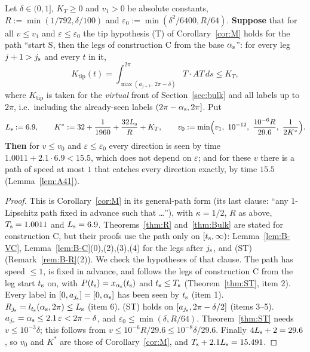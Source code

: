 \begin{corollary}\label{cor:ST}
Let $\delta\in(0,1]$, $K_T\ge0$ and $v_1>0$ be absolute constants, $R:=\min(1/792,\delta/100)$ and
$\varepsilon_0:=\min(\delta^2/6400,R/64)$. \textbf{Suppose} that for all $v\le v_1$ and $\varepsilon\le\varepsilon_0$ the tip
hypothesis \textup{(T)} of Corollary~\ref{cor:M} holds for the path ``start S, then the legs of construction C from the base
$\alpha_{\mathrm s}$'': for every leg $j+1>j_{\mathrm s}$ and every $t$ in it,
\[
K_{\mathrm{tip}}(t)=\int_{\max(a_{j+1},\,2\pi-\delta)}^{2\pi}T\cdot AT\,ds\le K_T ,
\]
where $K_{\mathrm{tip}}$ is taken for the \emph{virtual} front of Section~\ref{sec:bulk} and all labels up to $2\pi$, i.e.\ including the
already-seen labels $(2\pi-\alpha_{\mathrm s},2\pi]$. Put
\[
\BLs:=6.9,\qquad K^*:=32+\frac1{1960}+\frac{32\BLs}R+K_T,\qquad
v_0:=\min\Bigl(v_1,\ 10^{-12},\ \frac{10^{-6}R}{29.6},\ \frac1{2K^*}\Bigr).
\]
\textbf{Then} for $v\le v_0$ and $\varepsilon\le\varepsilon_0$ every direction is seen by time $1.0011+2.1\cdot6.9<15.5$, which does
not depend on $\varepsilon$; and for these $v$ there is a path of speed at most $1$ that catches every direction exactly, by time
$15.5$ (Lemma~\ref{lem:A41}).
\end{corollary}
\begin{proof}
This is Corollary~\ref{cor:M} in its general-path form (its last clause: ``any $1$-Lipschitz path fixed in advance such that
\dots''), with $\kappa=1/2$, $R$ as above, $T_{\mathrm s}=1.0011$ and $L_{\mathrm s}=6.9$. Theorems~\ref{thm:R} and~\ref{thm:Bulk} are stated for
construction C, but their proofs use the path only on $[t_{\mathrm s},\infty)$: Lemma~\ref{lem:B-VC}, Lemma~\ref{lem:B-C}(0),(2),(3),(4) for the
legs after $j_{\mathrm s}$, and \textup{(ST)} (Remark~\ref{rem:B-R}(2)). We check the hypotheses of that clause. The path has speed $\le1$, is
fixed in advance, and follows the legs of construction C from the leg start $t_{\mathrm s}$ on, with $P(t_{\mathrm s})=x_{\alpha_{\mathrm s}}(t_{\mathrm s})$ and
$t_{\mathrm s}\le T_{\mathrm s}$ (Theorem~\ref{thm:ST}, item 2). Every label in $[0,a_{j_{\mathrm s}}]=[0,\alpha_{\mathrm s}]$ has been seen by $t_{\mathrm s}$ (item 1).
$R_{j_{\mathrm s}}=l_{t_{\mathrm s}}(\alpha_{\mathrm s},2\pi)\le L_{\mathrm s}$ (item 6). \textup{(ST)} holds on $[a_{j_{\mathrm s}},2\pi-\delta/2]$ (items 3--5).
$a_{j_{\mathrm s}}=\alpha_{\mathrm s}\le2.1\,\varepsilon<2\pi-\delta$, and $\varepsilon_0\le\min(\delta,R/64)$. Theorem~\ref{thm:ST} needs
$v\le10^{-3}\delta$; this follows from $v\le10^{-6}R/29.6\le10^{-8}\delta/29.6$. Finally $4L_{\mathrm s}+2=29.6$, so $v_0$ and $K^*$ are those
of Corollary~\ref{cor:M}, and $T_{\mathrm s}+2.1L_{\mathrm s}=15.491$.
\end{proof}

